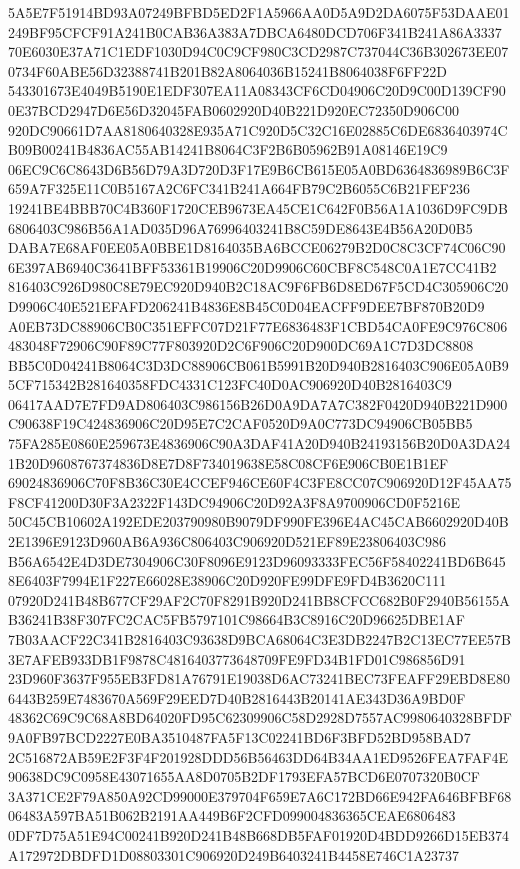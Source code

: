 \documentclass[UTF8,fontset=fandol,zihao=-4,a4paper]{ctexart}
\begin{document}
{{5A5E7F51914BD93A07249BFBD5ED2F1A5966AA0D5A9D2DA6075F53DAAE01249BF95CFCF91A241B0CAB36A383A7DBCA6480DCD706F341B241A86A3337
70E6030E37A71C1EDF1030D94C0C9CF980C3CD2987C737044C36B302673EE070734F60ABE56D32388741B201B82A8064036B15241B8064038F6FF22D
543301673E4049B5190E1EDF307EA11A08343CF6CD04906C20D9C00D139CF900E37BCD2947D6E56D32045FAB0602920D40B221D920EC72350D906C00
920DC90661D7AA8180640328E935A71C920D5C32C16E02885C6DE6836403974CB09B00241B4836AC55AB14241B8064C3F2B6B05962B91A08146E19C9
06EC9C6C8643D6B56D79A3D720D3F17E9B6CB615E05A0BD6364836989B6C3F659A7F325E11C0B5167A2C6FC341B241A664FB79C2B6055C6B21FEF236
19241BE4BBB70C4B360F1720CEB9673EA45CE1C642F0B56A1A1036D9FC9DB6806403C986B56A1AD035D96A76996403241B8C59DE8643E4B56A20D0B5
DABA7E68AF0EE05A0BBE1D8164035BA6BCCE06279B2D0C8C3CF74C06C906E397AB6940C3641BFF53361B19906C20D9906C60CBF8C548C0A1E7CC41B2
816403C926D980C8E79EC920D940B2C18AC9F6FB6D8ED67F5CD4C305906C20D9906C40E521EFAFD206241B4836E8B45C0D04EACFF9DEE7BF870B20D9
A0EB73DC88906CB0C351EFFC07D21F77E6836483F1CBD54CA0FE9C976C806483048F72906C90F89C77F803920D2C6F906C20D900DC69A1C7D3DC8808
BB5C0D04241B8064C3D3DC88906CB061B5991B20D940B2816403C906E05A0B95CF715342B281640358FDC4331C123FC40D0AC906920D40B2816403C9
06417AAD7E7FD9AD806403C986156B26D0A9DA7A7C382F0420D940B221D900C90638F19C424836906C20D95E7C2CAF0520D9A0C773DC94906CB05BB5
75FA285E0860E259673E4836906C90A3DAF41A20D940B24193156B20D0A3DA241B20D9608767374836D8E7D8F734019638E58C08CF6E906CB0E1B1EF
69024836906C70F8B36C30E4CCEF946CE60F4C3FE8CC07C906920D12F45AA75F8CF41200D30F3A2322F143DC94906C20D92A3F8A9700906CD0F5216E
50C45CB10602A192EDE203790980B9079DF990FE396E4AC45CAB6602920D40B2E1396E9123D960AB6A936C806403C906920D521EF89E23806403C986
B56A6542E4D3DE7304906C30F8096E9123D96093333FEC56F58402241BD6B6458E6403F7994E1F227E66028E38906C20D920FE99DFE9FD4B3620C111
07920D241B48B677CF29AF2C70F8291B920D241BB8CFCC682B0F2940B56155AB36241B38F307FC2CAC5FB5797101C98664B3C8916C20D96625DBE1AF
7B03AACF22C341B2816403C93638D9BCA68064C3E3DB2247B2C13EC77EE57B3E7AFEB933DB1F9878C4816403773648709FE9FD34B1FD01C986856D91
23D960F3637F955EB3FD81A76791E19038D6AC73241BEC73FEAFF29EBD8E806443B259E7483670A569F29EED7D40B2816443B20141AE343D36A9BD0F
48362C69C9C68A8BD64020FD95C62309906C58D2928D7557AC9980640328BFDF9A0FB97BCD2227E0BA3510487FA5F13C02241BD6F3BFD52BD958BAD7
2C516872AB59E2F3F4F201928DDD56B56463DD64B34AA1ED9526FEA7FAF4E90638DC9C0958E43071655AA8D0705B2DF1793EFA57BCD6E0707320B0CF
3A371CE2F79A850A92CD99000E379704F659E7A6C172BD66E942FA646BFBF6806483A597BA51B062B2191AA449B6F2CFD099004836365CEAE6806483
0DF7D75A51E94C00241B920D241B48B668DB5FAF01920D4BDD9266D15EB374A172972DBDFD1D08803301C906920D249B6403241B4458E746C1A23737
}}
\end{document}
